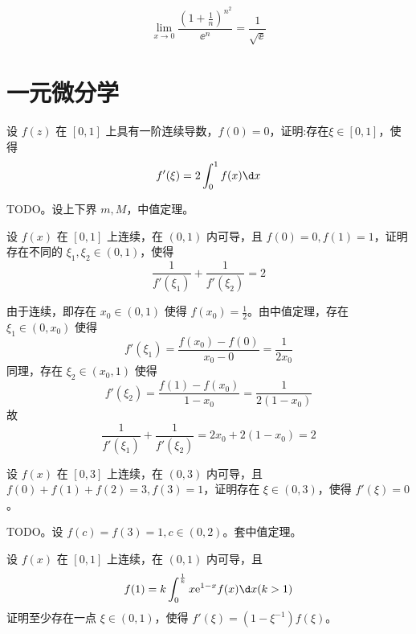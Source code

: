 \begin{solution}
	\[ \lim_{x \to 0} \frac{\left(1+\frac{1}{n}\right)^{n^2}}{\ee^n} = \frac{1}{\sqrt{\ee}} \]
\end{solution}

\section{一元微分学}

\begin{problem}[000009]
设 $f(z)$ 在 $[0,1]$ 上具有一阶连续导数，$f(0) = 0$，证明:存在$\xi \in [0,1]$，使得
\[ f'(\xi) = 2\int_0^1f(x) \d x \]
\end{problem}

\begin{solution}
	TODO。设上下界 $m, M$，中值定理。
\end{solution}

\begin{problem}[000010]
设 $f(x)$ 在 $[0, 1]$ 上连续，在 $(0, 1)$ 内可导，且 $f(0) = 0, f(1) = 1$，证明存在不同的 $\xi_1, \xi_2 \in (0, 1)$，使得
\[ \frac{1}{f'(\xi_1)} + \frac{1}{f'(\xi_2)} = 2 \]
\end{problem}

\begin{solution}
	由于连续，即存在 $x_0 \in (0, 1)$ 使得 $f(x_0) = \frac{1}{2}$。由中值定理，存在 $\xi_1 \in (0, x_0)$ 使得
	\[ f'(\xi_1) = \frac{f(x_0) - f(0)}{x_0 - 0} = \frac{1}{2x_0}
	\]
	同理，存在 $\xi_2 \in (x_0, 1)$ 使得
	\[ f'(\xi_2) = \frac{f(1) - f(x_0)}{1 - x_0} = \frac{1}{2(1 -x_0)} \]
	故
	\[ \frac{1}{f'(\xi_1)} + \frac{1}{f'(\xi_2)} = 2x_0 + 2(1 - x_0) = 2 \]

\end{solution}

\begin{problem}[000011]
设 $f(x)$ 在 $[0, 3]$ 上连续，在 $(0, 3)$ 内可导，且 $f(0) + f(1) + f(2) = 3, f(3) = 1$，证明存在 $\xi \in (0, 3)$，使得 $f'(\xi) = 0$。
\end{problem}

\begin{solution}
	TODO。设 $f(c) = f(3) = 1, c \in (0, 2)$。套中值定理。
\end{solution}

\begin{problem}[000012]
设 $f(x)$ 在 $[0, 1]$ 上连续，在 $(0, 1)$ 内可导，且
\[ f(1) = k \int_{0}^{\frac{1}{k}} x \ee^{1-x} f(x) \d x (k > 1) \]
证明至少存在一点 $\xi \in (0, 1)$，使得 $f'(\xi) = (1 - \xi^{-1})f(\xi)$。
\end{problem}

